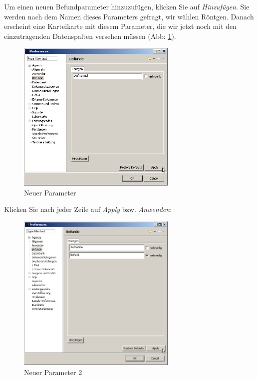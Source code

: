 Um einen neuen Befundparameter hinzuzufügen, klicken Sie auf  \textit{Hinzufügen}. Sie werden nach dem Namen dieses Parameters gefragt, wir wählen  Röntgen. Danach erscheint eine Karteikarte mit diesem Parameter, die wir jetzt noch mit den einzutragenden Datenspalten versehen müssen (Abb: \ref{fig:befunde2}).
\begin{figure}[htp]
\includegraphics[width=3in]{images/befunde2.png}
    \caption{Neuer Parameter}\label{fig:befunde2}
\end{figure}
Klicken Sie nach jeder Zeile auf  \textit{Apply}  bzw.  \textit{Anwenden}:
\begin{figure}[htp]
    \includegraphics[width=3in]{images/befunde3.png}
        \caption{Neuer Parameter 2}\label{fig:befunde3}
\end{figure}

